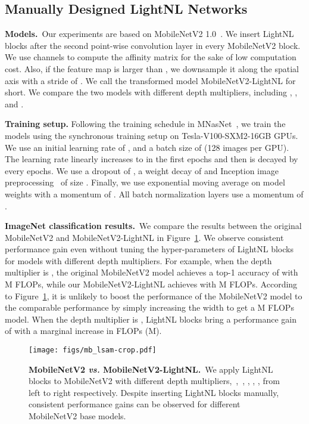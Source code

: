 \documentclass[10pt,twocolumn,letterpaper]{article}
\begin{document}
\subsection{Manually Designed LightNL Networks}\label{sec:exp_lsam}
\noindent\textbf{Models.}~Our experiments are based on MobileNetV2 1.0~\cite{sandler2018mobilenetv2}. We insert LightNL blocks after the second  point-wise convolution layer in every MobileNetV2 block. We use  channels to compute the affinity matrix for the sake of low computation cost. Also, if the feature map is larger than , we downsample it along the spatial axis with a stride of . We call the transformed model MobileNetV2-LightNL for short. We compare the two models with different depth multipliers, including , ,  and . 

\vspace{0.5ex}\noindent\textbf{Training setup.}
Following the training schedule in MNasNet~\cite{tan2019mnasnet}, we train the models using the synchronous training setup on  Tesla-V100-SXM2-16GB GPUs. We use an initial learning rate of , and a batch size of  (128 images per GPU). The learning rate linearly increases to  in the first  epochs and then is decayed by  every  epochs. We use a dropout of , a weight decay of  and Inception image preprocessing~\cite{szegedy2017inception} of size . Finally, we use exponential moving average on model weights with a momentum of . All batch normalization layers use a momentum of .

\vspace{0.5ex}\noindent\textbf{ImageNet classification results.}~We compare the results between the original MobileNetV2 and MobileNetV2-LightNL in Figure~\ref{fig:mbv2}. We observe consistent performance gain even without tuning the hyper-parameters of LightNL blocks for models with different depth multipliers. For example, when the depth multiplier is , the original MobileNetV2 model achieves a top-1 accuracy of  with M FLOPs, while our MobileNetV2-LightNL achieves  with M FLOPs. According to Figure~\ref{fig:mbv2}, it is unlikely to boost the performance of the MobileNetV2 model to the comparable performance by simply increasing the width to get a M FLOPs model.
When the depth multiplier is , LightNL blocks bring a performance gain of  with a marginal increase in FLOPs (M).

\begin{figure}[tb]
\centering
\texttt{[image: figs/mb\_lsam-crop.pdf]}
\caption{\textbf{MobileNetV2 \emph{vs.} MobileNetV2-LightNL.}~We apply LightNL blocks to MobileNetV2 with different depth multipliers,~\ie,~, , , , from left to right respectively. Despite inserting LightNL blocks manually, consistent performance gains can be observed for different MobileNetV2 base models.}
\label{fig:mbv2}
\vspace{-1em}
\end{figure}
\end{document}
